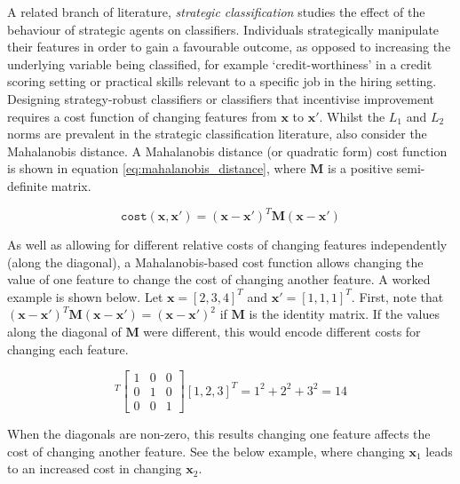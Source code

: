 A related branch of literature, \textit{strategic classification} studies the effect of the behaviour of strategic agents on classifiers. Individuals strategically manipulate their features in order to gain a favourable outcome, as opposed to increasing the underlying variable being classified, for example `credit-worthiness' in a credit scoring setting or practical skills relevant to a specific job in the hiring setting. Designing strategy-robust classifiers or classifiers that incentivise improvement requires a cost function of changing features from $\boldsymbol{x}$ to $\boldsymbol{x}'$. Whilst the  $L_1$ and $L_2$ norms are prevalent in the strategic classification literature, \textcite{bechavodInformationDiscrepancyStrategic2022} also consider the Mahalanobis distance. A Mahalanobis distance (or quadratic form) cost function is shown in equation \ref{eq:mahalanobis_distance}, where $\boldsymbol{M}$ is a positive semi-definite matrix. 

\begin{equation} \label{eq:mahalanobis_distance}
	\texttt{cost}(\boldsymbol{x}, \boldsymbol{x}') = (\boldsymbol{x} -\boldsymbol{x}')^T\boldsymbol{M}(\boldsymbol{x} - \boldsymbol{x}')
\end{equation}

As well as allowing for different relative costs of changing features independently (along the diagonal), a Mahalanobis-based cost function allows changing the value of one feature to change the cost of changing another feature. A worked example is shown below. Let $\boldsymbol{x} = [2,3,4]^T$ and $\boldsymbol{x}' = [1,1,1]^T$. First, note that $(\boldsymbol{x} -\boldsymbol{x}')^T\boldsymbol{M}(\boldsymbol{x} - \boldsymbol{x}') = (\boldsymbol{x} -\boldsymbol{x}')^2$ if $\boldsymbol{M}$ is the identity matrix. If the values along the diagonal of $\boldsymbol{M}$ were different, this would encode different costs for changing each feature.

\begin{equation}
	[1, 2, 3]^T \left[\begin{array}{lllll}
		1 & 0 & 0 \\
		0 & 1 & 0 \\
		0 & 0 & 1
	\end{array}\right] [1, 2, 3]^T = 1^2 + 2^2 + 3^2 = 14
\end{equation}

When the diagonals are non-zero, this results changing one feature affects the cost of changing another feature. See the below example, where changing $\boldsymbol{x}_1$ leads to an increased cost in changing $\boldsymbol{x}_2$.

